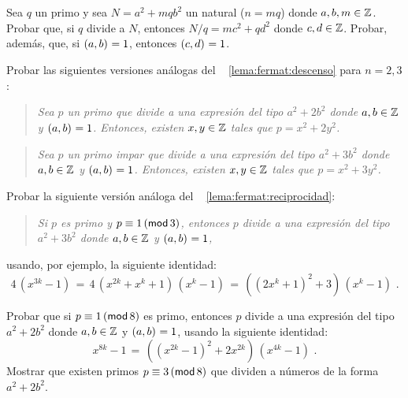\begin{ejerFermat}\label{ejer:fermat:descenso:caso}
	Sea $q$ un primo y sea $N=a^2+mqb^2$ un natural ($n=mq$) donde
	$a,b,m\in\Enteros$.
	Probar que, si $q$ divide a $N$, entonces $N/q=mc^2+qd^2$ donde
	$c,d\in\Enteros$.
	Probar, adem\'as, que, si $\mcd{a,b}=1$, entonces $\mcd{c,d}=1$.
\end{ejerFermat}

\begin{ejerFermat}\label{ejer:fermat:descenso}
	Probar las siguientes versiones an\'alogas del \lemaname~%
	\ref{lema:fermat:descenso} para $n=2,3$:%
	\begin{quote}
		\itshape
		Sea $p$ un primo que divide a una expresi\'on
		del tipo $a^2+2b^2$ donde $a,b\in\Enteros$ y
		$\mcd{a,b}=1$. Entonces, existen
		$x,y\in\Enteros$ tales que $p=x^2+2y^2$.
	\end{quote}
	\begin{quote}
		\itshape
		Sea $p$ un primo impar que divide a una
		expresi\'on del tipo $a^2+3b^2$ donde
		$a,b\in\Enteros$ y $\mcd{a,b}=1$. Entonces,
		existen $x,y\in\Enteros$ tales que
		$p=x^2+3y^2$.
	\end{quote}
\end{ejerFermat}

\begin{ejerFermat}
	Probar la siguiente versi\'on an\'aloga del \lemaname~%
	\ref{lema:fermat:reciprocidad}:
	\begin{quote}
		\itshape
		Si $p$ es primo y $p\equiv 1\tmodulo[3]$, entonces $p$ divide
		a una expresi\'on del tipo $a^2+3b^2$ donde $a,b\in\Enteros$
		y $\mcd{a,b}=1$,
	\end{quote}
	usando, por ejemplo, la siguiente identidad:
	\begin{displaymath}
		4\,(x^{3k}-1)\,=\,4\,(x^{2k}+x^k+1)\,(x^k-1)\,=\,
			((2x^k+1)^2+3)\,(x^k-1)
		\text{ .}
	\end{displaymath}
\end{ejerFermat}

\begin{ejerFermat}
	Probar que si $p\equiv 1\tmodulo[8]$ es primo, entonces $p$ divide a
	una expresi\'on del tipo $a^2+2b^2$ donde $a,b\in\Enteros$ y
	$\mcd{a,b}=1$, usando la siguiente identidad:
	\begin{displaymath}
		x^{8k}-1\,=\, ((x^{2k}-1)^2+2x^{2k})\,(x^{4k}-1)
		\text{ .}
	\end{displaymath}
	Mostrar que existen primos $p\equiv 3\tmodulo[8]$ que dividen a
	n\'umeros de la forma $a^2+2b^2$.
\end{ejerFermat}

